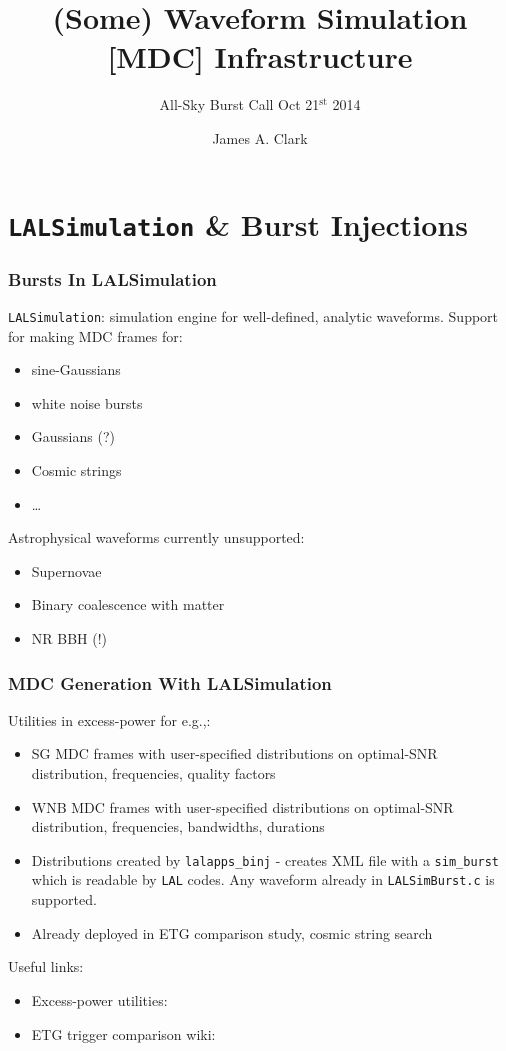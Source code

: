 \documentclass{beamer}
\begin{document}
\title{(Some) Waveform Simulation [MDC] Infrastructure}
\subtitle{All-Sky Burst Call Oct 21$^{\text{st}}$ 2014}  
\author{James A. Clark}
\date{} 

\begin{frame}[plain]
\titlepage
\end{frame}


\section{{\tt LALSimulation} \& Burst Injections}

\begin{frame}
    \frametitle{Bursts In LALSimulation}
    {\tt LALSimulation}: simulation engine for well-defined, analytic waveforms.
    Support for making MDC frames for:
    \begin{itemize}
        \item sine-Gaussians
        \item white noise bursts
        \item Gaussians (?)
        \item Cosmic strings
        \item \dots
    \end{itemize}
    Astrophysical waveforms currently unsupported:
    \begin{itemize}
        \item Supernovae
        \item Binary coalescence with matter
        \item NR BBH (!)
    \end{itemize}
\end{frame}

\begin{frame}
    \frametitle{MDC Generation With LALSimulation}
    Utilities in excess-power for e.g.,:
    \begin{itemize}
        \item SG MDC frames with user-specified distributions on optimal-SNR
            distribution, frequencies, quality factors
        \item WNB MDC frames with user-specified distributions on optimal-SNR
            distribution, frequencies, bandwidths, durations
        \item Distributions created by {\tt lalapps\_binj} - creates XML file
            with a {\tt sim\_burst} which is readable by {\tt LAL} codes.  Any
            waveform already in {\tt LALSimBurst.c} is supported.
        \item Already deployed in ETG comparison study, cosmic string search 
    \end{itemize}
    Useful links:
    \begin{itemize}
        \item Excess-power utilities: 
        \item ETG trigger comparison wiki:
    \end{itemize}
\end{frame}
\end{document}
